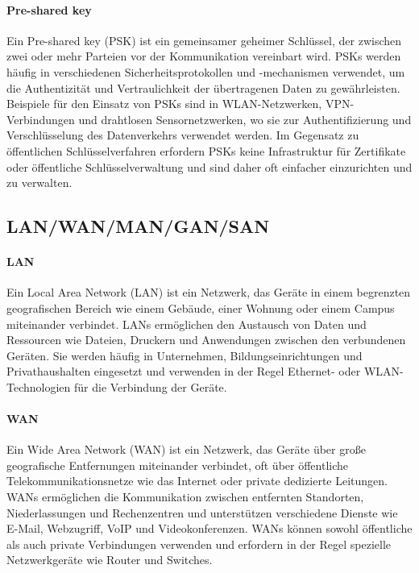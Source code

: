 \paragraph{Pre-shared key}

Ein Pre-shared key (PSK) ist ein gemeinsamer geheimer Schlüssel, der zwischen zwei oder mehr Parteien vor der Kommunikation vereinbart wird. PSKs werden häufig in verschiedenen Sicherheitsprotokollen und -mechanismen verwendet, um die Authentizität und Vertraulichkeit der übertragenen Daten zu gewährleisten. Beispiele für den Einsatz von PSKs sind in WLAN-Netzwerken, VPN-Verbindungen und drahtlosen Sensornetzwerken, wo sie zur Authentifizierung und Verschlüsselung des Datenverkehrs verwendet werden. Im Gegensatz zu öffentlichen Schlüsselverfahren erfordern PSKs keine Infrastruktur für Zertifikate oder öffentliche Schlüsselverwaltung und sind daher oft einfacher einzurichten und zu verwalten.

\subsection{LAN/WAN/MAN/GAN/SAN}

\paragraph{LAN}

Ein Local Area Network (LAN) ist ein Netzwerk, das Geräte in einem begrenzten geografischen Bereich wie einem Gebäude, einer Wohnung oder einem Campus miteinander verbindet. LANs ermöglichen den Austausch von Daten und Ressourcen wie Dateien, Druckern und Anwendungen zwischen den verbundenen Geräten. Sie werden häufig in Unternehmen, Bildungseinrichtungen und Privathaushalten eingesetzt und verwenden in der Regel Ethernet- oder WLAN-Technologien für die Verbindung der Geräte.

\paragraph{WAN}

Ein Wide Area Network (WAN) ist ein Netzwerk, das Geräte über große geografische Entfernungen miteinander verbindet, oft über öffentliche Telekommunikationsnetze wie das Internet oder private dedizierte Leitungen. WANs ermöglichen die Kommunikation zwischen entfernten Standorten, Niederlassungen und Rechenzentren und unterstützen verschiedene Dienste wie E-Mail, Webzugriff, VoIP und Videokonferenzen. WANs können sowohl öffentliche als auch private Verbindungen verwenden und erfordern in der Regel spezielle Netzwerkgeräte wie Router und Switches.

